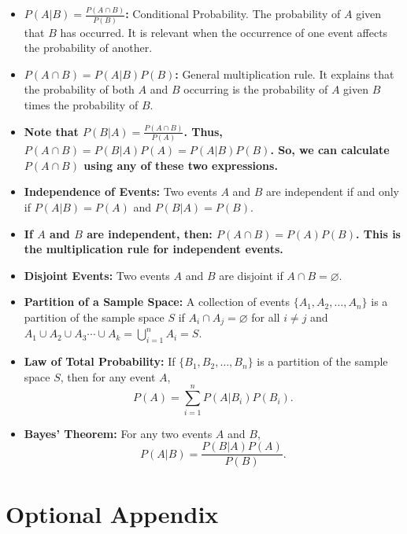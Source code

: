 \documentclass{article}
\let\emptyset\varnothing
\begin{document}
\begin{itemize}
    \item \textbf{\( P(A|B) = \frac{P(A \cap B)}{P(B)} \):} Conditional Probability. The probability of \( A \) given that \( B \) has occurred. It is relevant when the occurrence of one event affects the probability of another.

    \item \textbf{\( P(A \cap B) = P(A|B) P(B) \):} General multiplication rule. It explains that the probability of both \( A \) and \( B \) occurring is the probability of \( A \) given \( B \) times the probability of \( B \).

    \item \textbf{Note that \( P(B|A) = \frac{P(A \cap B)}{P(A)} \). Thus, \( P(A \cap B) = P(B|A) P(A) = P(A|B) P(B) \). So, we can calculate \( P(A \cap B) \) using any of these two expressions.}

    \item \textbf{Independence of Events:} Two events \( A \) and \( B \) are independent if and only if \( P(A|B) = P(A) \) and \( P(B|A) = P(B) \).

    \item \textbf{If \( A \) and \( B \) are independent, then: \( P(A \cap B) = P(A) P(B) \). This is the multiplication rule for independent events.}

    \item \textbf{Disjoint Events:} Two events \( A \) and \( B \) are disjoint if \( A \cap B = \emptyset \).

    \item \textbf{Partition of a Sample Space:} A collection of events \( \{A_1, A_2, \ldots, A_n\} \) is a partition of the sample space \( S \) if \( A_i \cap A_j = \emptyset \) for all \( i \neq j \) and \( A_1 \cup A_2 \cup A_3 \cdots \cup A_k = \bigcup_{i=1}^n A_i = S \).

    \item \textbf{Law of Total Probability:} If \( \{B_1, B_2, \ldots, B_n\} \) is a partition of the sample space \( S \), then for any event \( A \),
    \[
    P(A) = \sum_{i=1}^n P(A|B_i) P(B_i).
    \]

    \item \textbf{Bayes' Theorem:} For any two events \( A \) and \( B \),
    \[
    P(A|B) = \frac{P(B|A)P(A)}{P(B)}.
    \]

\end{itemize}

\newpage

\section*{Optional Appendix}
\end{document}

